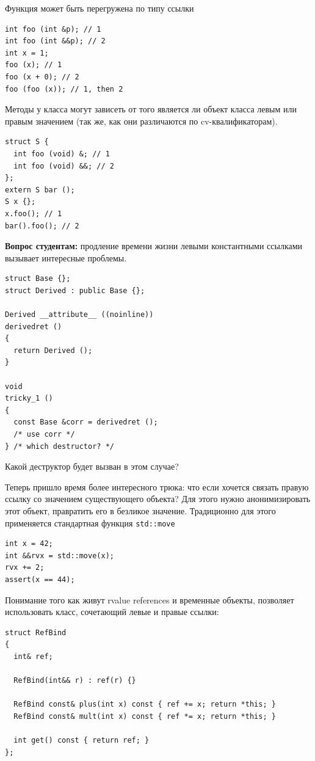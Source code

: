 \documentclass[a4paper,12pt,oneside]{article}
\newif\ifanswers
\begin{document}
Функция может быть перегружена по типу ссылки

\begin{lstlisting}
int foo (int &p); // 1
int foo (int &&p); // 2
int x = 1;
foo (x); // 1
foo (x + 0); // 2
foo (foo (x)); // 1, then 2
\end{lstlisting}

Методы у класса могут зависеть от того является ли объект класса левым или правым значением (так же, как они различаются по cv-квалификаторам).

\begin{lstlisting}
struct S {
  int foo (void) &; // 1
  int foo (void) &&; // 2
};
extern S bar ();
S x {};
x.foo(); // 1
bar().foo(); // 2
\end{lstlisting}

\textbf{Вопрос студентам:} продление времени жизни левыми константными ссылками вызывает интересные проблемы.

\begin{lstlisting}
struct Base {};
struct Derived : public Base {};

Derived __attribute__ ((noinline))
derivedret ()
{
  return Derived ();
}

void
tricky_1 ()
{
  const Base &corr = derivedret ();
  /* use corr */
} /* which destructor? */
\end{lstlisting}

Какой деструктор будет вызван в этом случае? 

\ifanswers
Правильный ответ: Оказывается статический тип временного объекта известен компилятору и будет вызван деструктор класса \lstinline!Derived!. То есть ссылки не требуют виртуальных деструкторов для своей диспетчеризации -- компилятор сам может построить верный код удаления.
\fi

Теперь пришло время более интересного трюка: что если хочется связать правую ссылку со значением существующего объекта? Для этого нужно анонимизировать этот объект, правратить его в безликое значение. Традиционно для этого применяется стандартная функция \lstinline!std::move!

\begin{lstlisting}
int x = 42;
int &&rvx = std::move(x);
rvx += 2; 
assert(x == 44);
\end{lstlisting}

Понимание того как живут rvalue references и временные объекты, позволяет использовать класс, сочетающий левые и правые ссылки:

\begin{lstlisting}
struct RefBind
{
  int& ref;

  RefBind(int&& r) : ref(r) {}

  RefBind const& plus(int x) const { ref += x; return *this; }
  RefBind const& mult(int x) const { ref *= x; return *this; }

  int get() const { return ref; }
};
\end{lstlisting}
\end{document}
